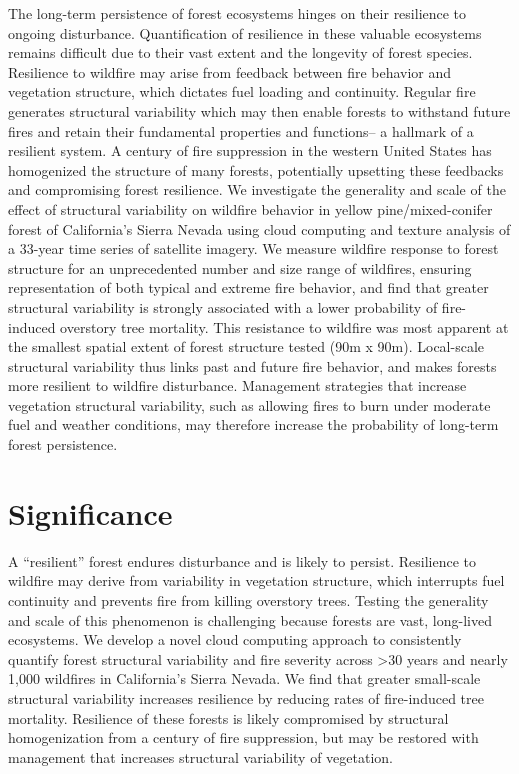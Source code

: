 \documentclass[twoside,12pt,final]{ucthesis-CA2012}
\begin{document}
\begin{ucmainmatter}
The long-term persistence of forest ecosystems hinges on their
resilience to ongoing disturbance. Quantification of resilience in these
valuable ecosystems remains difficult due to their vast extent and the
longevity of forest species. Resilience to wildfire may arise from
feedback between fire behavior and vegetation structure, which dictates
fuel loading and continuity. Regular fire generates structural
variability which may then enable forests to withstand future fires and
retain their fundamental properties and functions-- a hallmark of a
resilient system. A century of fire suppression in the western United
States has homogenized the structure of many forests, potentially
upsetting these feedbacks and compromising forest resilience. We
investigate the generality and scale of the effect of structural
variability on wildfire behavior in yellow pine/mixed-conifer forest of
California's Sierra Nevada using cloud computing and texture analysis of
a 33-year time series of satellite imagery. We measure wildfire response
to forest structure for an unprecedented number and size range of
wildfires, ensuring representation of both typical and extreme fire
behavior, and find that greater structural variability is strongly
associated with a lower probability of fire-induced overstory tree
mortality. This resistance to wildfire was most apparent at the smallest
spatial extent of forest structure tested (90m x 90m). Local-scale
structural variability thus links past and future fire behavior, and
makes forests more resilient to wildfire disturbance. Management
strategies that increase vegetation structural variability, such as
allowing fires to burn under moderate fuel and weather conditions, may
therefore increase the probability of long-term forest persistence.

\section{Significance}\label{significance}

A ``resilient'' forest endures disturbance and is likely to persist.
Resilience to wildfire may derive from variability in vegetation
structure, which interrupts fuel continuity and prevents fire from
killing overstory trees. Testing the generality and scale of this
phenomenon is challenging because forests are vast, long-lived
ecosystems. We develop a novel cloud computing approach to consistently
quantify forest structural variability and fire severity across
\textgreater{}30 years and nearly 1,000 wildfires in California's Sierra
Nevada. We find that greater small-scale structural variability
increases resilience by reducing rates of fire-induced tree mortality.
Resilience of these forests is likely compromised by structural
homogenization from a century of fire suppression, but may be restored
with management that increases structural variability of vegetation.


\end{ucmainmatter}
\end{document}
